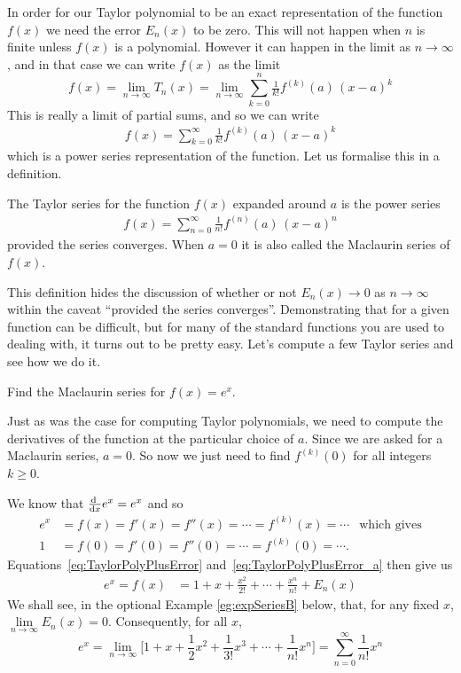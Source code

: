 In order for our Taylor polynomial to be an exact representation of
the function $f(x)$ we need the error $E_n(x)$ to be zero.
This will not happen when $n$ is finite unless $f(x)$ is a
polynomial. However it can happen in the limit as $n \to \infty$,
and in that case we can write $f(x)$ as the limit
\begin{equation*}
f(x)=\lim_{n\rightarrow\infty} T_n(x)
=\lim_{n\rightarrow\infty} \sum_{k=0}^n \tfrac{1}{k!}f^{(k)}(a)\, (x-a)^k
\end{equation*}
This is really a limit of partial sums, and so we can write
\begin{align*}
f(x)=\sum_{k=0}^\infty \tfrac{1}{k!}f^{(k)}(a)\, (x-a)^k
\end{align*}
which is a power series representation of the function. Let us
formalise this in a definition.
\begin{defn}\label{defn:taylorSeries}
The Taylor series for the function $f(x)$ expanded around $a$
is the power series
\begin{align*}
f(x)=\sum_{n=0}^\infty \tfrac{1}{n!}f^{(n)}(a)\, (x-a)^n
\end{align*}
provided the series converges. When $a=0$ it is also called the Maclaurin series of $f(x)$.
\end{defn}
\noindent
This definition hides the discussion of whether or not $E_n(x) \to 0$
as $n\rightarrow\infty$ within the caveat ``provided the series converges''.
Demonstrating that for a given function can be difficult, but for many
of the standard functions you are used to dealing with, it turns out to be
pretty easy. Let's compute a few Taylor series and see how we do it.

\begin{eg}\label{eg:expSeries}

Find the Maclaurin series for $f(x)=e^x$.

\soln Just as was the case for computing Taylor polynomials, we need
to compute the derivatives of the function at the
particular choice of $a$. Since we are asked for a Maclaurin series,
$a=0$. So now we just need to find
$f^{(k)}(0)$ for all integers $k\ge 0$.

We know that $\diff{}{x}e^x = e^x$ and so
\begin{align*}
  e^x &= f(x) = f'(x) = f''(x) = \cdots = f^{(k)}(x) = \cdots & \text{which gives}\\
  1 &= f(0) = f'(0) = f''(0) = \cdots = f^{(k)}(0) = \cdots.
\end{align*}
Equations~\eqref{eq:TaylorPolyPlusError} and~\eqref{eq:TaylorPolyPlusError_a} then give us
\begin{align*}
e^x=f(x)&=
1+x+\frac{x^2}{2!}+\cdots+\frac{x^n}{n!}+E_n(x)
\end{align*}
We shall see, in the optional Example \ref{eg:expSeriesB} below, that,
for any fixed $x$, $\lim\limits_{n\rightarrow\infty}E_n(x)=0$.
Consequently, for all $x$,
\begin{equation*}%
e^x=\lim_{n\rightarrow\infty}\Big[1 +x + \frac{1}{2} x^2
     +\frac{1}{3!} x^3+\cdots+\frac{1}{n!} x^n\Big]
    =\sum_{n=0}^\infty \frac{1}{n!}x^n
\end{equation*}
\end{eg}


